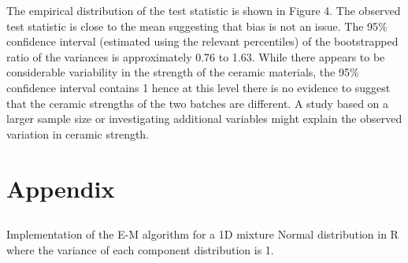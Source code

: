 \documentclass[a4paper, 10pt]{article}
\begin{document}
The empirical distribution of the test statistic is shown in Figure 4. The observed test statistic is close to the mean suggesting that bias is not an issue. The 95\% confidence interval (estimated using the relevant percentiles) of the bootstrapped ratio of the variances is approximately 0.76 to 1.63. While there appears to be considerable variability in the strength of the ceramic materials, the 95\% confidence interval contains 1 hence at this level there is no evidence to suggest that the ceramic strengths of the two batches are different. A study based on a larger sample size or investigating additional variables might explain the observed variation in ceramic strength.



\clearpage
\appendix
\section{Appendix}

\subsection{ }
Implementation of the E-M algorithm for a 1D  mixture Normal distribution in R where the variance of each component distribution is 1.
\end{document}
